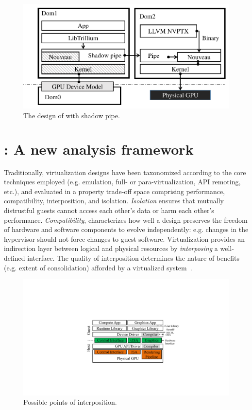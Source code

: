 \begin{figure}[!th]
	\centering
		\includegraphics[width=.5\linewidth,trim={0.6cm 0 0 0},clip]{trillium/images/design/trillium.pdf}
		\caption{The design of \Trillium with shadow pipe.}
		\label{fig_trillium_direct2}
\end{figure}

\section{\iemts: A new analysis framework}

Traditionally, virtualization designs have been taxonomized
according to the core techniques employed (e.g. emulation, full- or
para-virtualization, API remoting, etc.), and evaluated
in a property trade-off space comprising performance,
compatibility, interposition, and isolation. \emph{Isolation} ensures that
mutually distrustful guests cannot access each other's data or harm each
other's performance. \emph{Compatibility}, characterizes how well a design
preserves the freedom of hardware and software components to evolve
independently: e.g. changes in the hypervisor should not force changes to
guest software. Virtualization provides an indirection layer between
logical and physical resources by \emph{interposing} a well-defined interface.
The quality of interposition determines the nature of benefits (e.g. extent of
consolidation) afforded by a virtualized system~\cite{waldspurger12cacm}.

\begin{figure}[!tt]
	\centering
	\includegraphics[width=.5\linewidth,trim={10cm 5cm 8cm 6.5cm},clip]{figures/interposition.pdf}
	\caption{Possible points of interposition.}
	\label{fig_interposition}
\end{figure}

